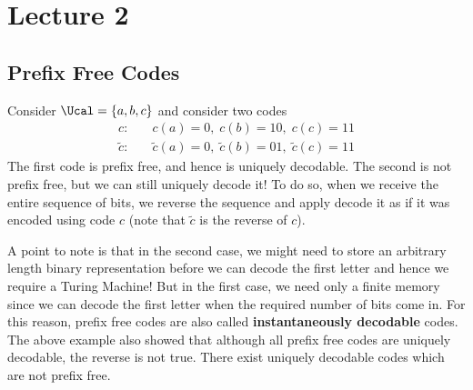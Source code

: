 \chapter{Lecture 2}
\section{Prefix Free Codes}
\begin{eg}
    Consider $\Ucal = \{a,b,c\}$ and consider two codes
    \begin{align*}
        c:&\quad c(a) = 0,\; c(b) = 10,\; c(c) = 11 \\
        \widetilde{c}:& \quad\widetilde{c}(a) = 0,\; \widetilde c(b) = 01, \; \widetilde c(c) = 11
    \end{align*}
    The first code is prefix free, and hence is uniquely decodable. The second is not prefix free, but we can still uniquely decode it! To do so, when we receive the entire sequence of bits, we reverse the sequence and apply decode it as if it was encoded using code $c$ (note that $\widetilde c$ is the reverse of $c$).
\end{eg}
A point to note is that in the second case, we might need to store an arbitrary length binary representation before we can decode the first letter and hence we require a Turing Machine! But in the first case, we need only a finite memory since we can decode the first letter when the required number of bits come in. For this reason, prefix free codes are also called \textbf{instantaneously decodable} codes. The above example also showed that although all prefix free codes are uniquely decodable, the reverse is not true. There exist uniquely decodable codes which are not prefix free.

